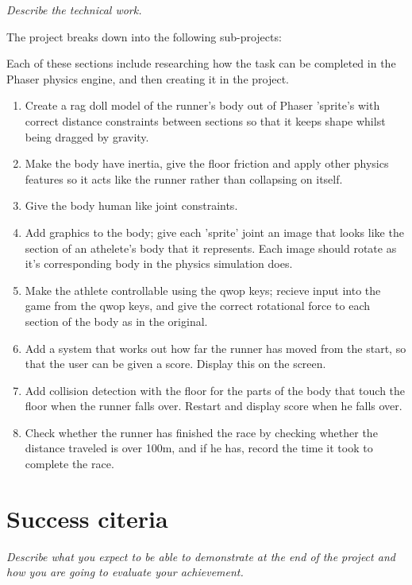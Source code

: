 \documentclass[12pt,a4paper,twoside]{article}
\begin{document}
\emph{Describe the technical work.}

The project breaks down into the following sub-projects:

Each of these sections include researching how the task can be completed in the Phaser physics engine, and then creating it in the project.

\begin{enumerate}
\item Create a rag doll model of the runner's body out of Phaser 'sprite's with correct distance constraints between sections so that it keeps shape whilst being dragged by gravity.
\item Make the body have inertia, give the floor friction and apply other physics features so it acts like the runner rather than collapsing on itself.
\item Give the body human like joint constraints.
\item Add graphics to the body; give each 'sprite' joint an image that looks like the section of an athelete's body that it represents. Each image should rotate as it's corresponding body in the physics simulation does.
\item Make the athlete controllable using the qwop keys; recieve input into the game from the qwop keys, and give the correct rotational force to each section of the body as in the original.
\item Add a system that works out how far the runner has moved from the start, so that the user can be given a score. Display this on the screen.
\item Add collision detection with the floor for the parts of the body that touch the floor when the runner falls over. Restart and display score when he falls over.
\item Check whether the runner has finished the race by checking whether the distance traveled is over 100m, and if he has, record the time it took to complete the race.
\end{enumerate}

\section*{Success citeria}

\emph{Describe what you expect to be able to demonstrate at the end of the project and how you are going to evaluate your achievement.}

\end{document}
